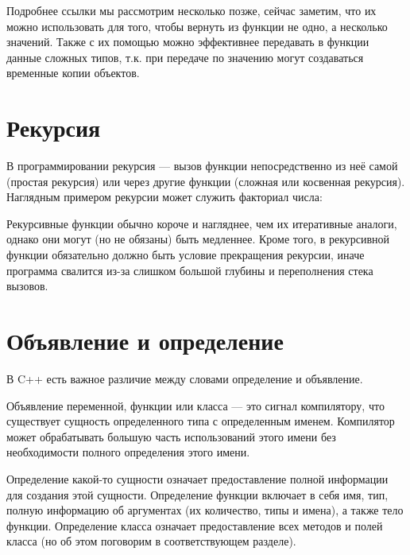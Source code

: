 \documentclass[book.tex]{subfiles}
\begin{document}
Подробнее ссылки мы рассмотрим несколько позже, сейчас заметим, что их можно использовать для того, чтобы вернуть из функции не одно, а несколько значений. Также с их помощью можно эффективнее передавать в функции данные сложных типов, т.к. при передаче по значению могут создаваться временные копии объектов.


\section*{Рекурсия}


В программировании рекурсия --- вызов функции непосредственно из неё самой (простая рекурсия) или через другие функции (сложная или косвенная рекурсия). Наглядным примером рекурсии может служить факториал числа:


Рекурсивные функции обычно короче и нагляднее, чем их итеративные аналоги, однако они могут (но не обязаны) быть медленнее. Кроме того, в рекурсивной функции обязательно должно быть условие прекращения рекурсии, иначе программа свалится из-за слишком большой глубины и переполнения стека вызовов.

\section*{Объявление и определение}

В C++ есть важное различие между словами определение и объявление. 

Объявление переменной, функции или класса --- это сигнал компилятору, что существует сущность определенного типа с определенным именем. Компилятор может обрабатывать большую часть использований этого имени без необходимости полного определения этого имени.

Определение какой-то сущности означает предоставление полной информации для создания этой сущности. Определение функции включает в себя имя, тип, полную информацию об аргументах (их количество, типы и имена), а также тело функции. Определение класса означает предоставление всех методов и полей класса (но об этом поговорим в соответствующем разделе).
\end{document}
